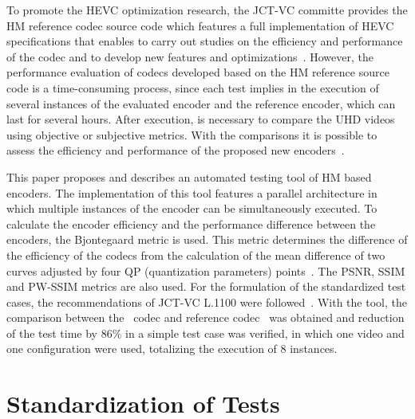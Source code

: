 \documentclass[journal]{IEEEtran}
\begin{document}
To promote the HEVC optimization research, the JCT-VC committe provides the HM reference codec source code which features a full implementation of HEVC specifications that enables to carry out studies on the efficiency and performance of the codec and to develop new features and optimizations~\cite{itu:10}. However, the performance evaluation of codecs developed based on the HM reference source code is a time-consuming process, since each test implies in the execution of several instances of the evaluated encoder and the reference encoder, which can last for several hours. After execution, is necessary to compare the UHD videos using objective or subjective metrics. With the comparisons it is possible to assess the efficiency and performance of the proposed new encoders~\cite{netflix:16}.

This paper proposes and describes an automated testing tool of HM based encoders. The implementation of this tool features a parallel architecture in which multiple instances of the encoder can be simultaneously executed. To calculate the encoder efficiency and the performance difference between the encoders, the Bjontegaard metric is used. This metric determines the difference of the efficiency of the codecs from the calculation of the mean difference of two curves adjusted by four QP (quantization parameters) points~\cite{Bjontegaard:01}. The PSNR, SSIM and PW-SSIM\cite{danilo:15a} metrics are also used. For the formulation of the standardized test cases, the recommendations of JCT-VC L.1100 were followed~\cite{Bossen:15}. With the tool, the comparison between the~\cite{oliveira:16} codec and reference codec~\cite{itu:10} was obtained and reduction of the test time by 86\% in a simple test case was verified, in which one video and one configuration were used, totalizing the execution of 8 instances.
	
	
\section{Standardization of Tests}	
\end{document}
